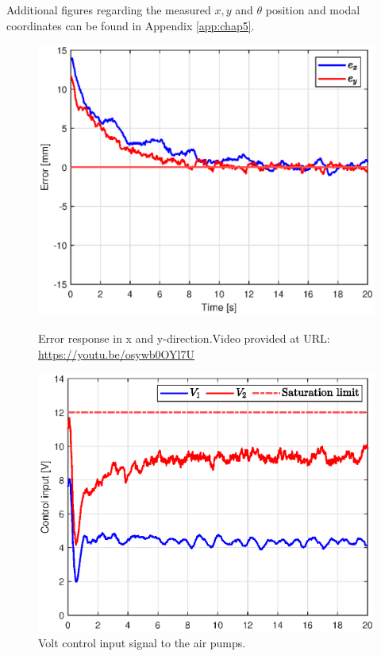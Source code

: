 Additional figures regarding the measured $x,y$ and $\theta$ position and modal coordinates can be found in Appendix \ref{app:chap5}.




\begin{figure}[H] 
    \begin{minipage}[b]{0.49\linewidth}
     \centering
    \includegraphics[width=\linewidth]{Figures/Chapter5/errorswingrightsquare.eps} 
    \caption{Error response in x and y-direction.Video provided at URL: \url{https://youtu.be/osywb0OYl7U}} 
    \label{fig5:errorswingright} 
       \end{minipage} 
    \begin{minipage}[b]{0.49\linewidth}
     \centering
    \includegraphics[width=\linewidth]{Figures/Chapter5/controlinputswingright.eps} 
    \caption{Volt control input signal to the air pumps.} 
    \label{fig5:inputswingright} 
    \end{minipage} 
\end{figure}

